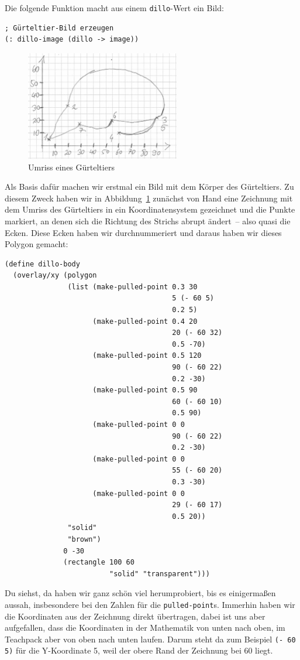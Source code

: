 Die folgende Funktion macht aus einem \lstinline{dillo}-Wert ein Bild:
%
\begin{lstlisting}
; Gürteltier-Bild erzeugen
(: dillo-image (dillo -> image))
\end{lstlisting}
%
\begin{figure}[tb]
  \centering
  \includegraphics[width=0.6\textwidth]{videospiele/dillo}
  \caption{Umriss eines Gürteltiers}
  \label{fig:dillo-body}
\end{figure}
Als Basis dafür machen wir erstmal ein Bild mit dem Körper des
Gürteltiers.  Zu diesem Zweck haben wir in
Abbildung~\ref{fig:dillo-body} zunächst von Hand eine
Zeichnung mit dem Umriss des Gürteltiers in ein Koordinatensystem
gezeichnet und die Punkte markiert, an denen sich die Richtung des
Strichs abrupt ändert~-- also quasi die Ecken.  Diese Ecken haben wir
durchnummeriert und daraus haben wir dieses Polygon gemacht:
%
\begin{lstlisting}
(define dillo-body
  (overlay/xy (polygon
               (list (make-pulled-point 0.3 30
                                        5 (- 60 5)
                                        0.2 5)
                     (make-pulled-point 0.4 20
                                        20 (- 60 32)
                                        0.5 -70)
                     (make-pulled-point 0.5 120 
                                        90 (- 60 22)
                                        0.2 -30)
                     (make-pulled-point 0.5 90
                                        60 (- 60 10)
                                        0.5 90)
                     (make-pulled-point 0 0 
                                        90 (- 60 22)
                                        0.2 -30)
                     (make-pulled-point 0 0
                                        55 (- 60 20)
                                        0.3 -30)
                     (make-pulled-point 0 0
                                        29 (- 60 17)
                                        0.5 20))
               "solid"
               "brown")
              0 -30
              (rectangle 100 60
                         "solid" "transparent")))
\end{lstlisting}
%
Du siehst, da haben wir ganz schön viel herumprobiert, bis es
einigermaßen aussah, insbesondere bei den Zahlen für die
\lstinline{pulled-point}s.  Immerhin haben wir die Koordinaten aus der
Zeichnung direkt übertragen, dabei ist uns aber aufgefallen, dass die
Koordinaten in der Mathematik von unten nach oben, im Teachpack aber
von oben nach unten laufen.  Darum steht da zum Beispiel
\lstinline{(- 60 5)} für die Y-Koordinate 5, weil der obere Rand der
Zeichnung bei 60 liegt.

